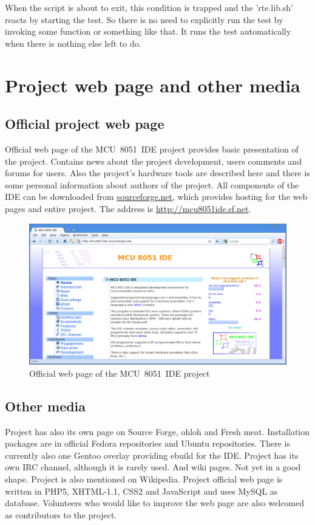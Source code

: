 \documentclass[a4paper,twoside,12pt]{book}
\begin{document}
		When the script is about to exit, this condition is trapped and the 'rte.lib.sh' reacts by starting the test. So there is no need to explicitly run the test by invoking some function or something like that. It runs the test automatically when there is nothing else left to do.

\chapter{Project web page and other media}
	\section{Official project web page}
		Official web page of the MCU~8051~IDE project provides basic presentation of the project. Contains news about the project development, users comments and forums for users. Also the project's hardware tools are described here and there is some personal information about authors of the project. All components of the IDE can be downloaded from \href{www.sourceforge.net}{sourceforge.net}, which provides hosting for the web pages and entire project. The address is \url{http://mcu8051ide.sf.net}.
		\begin{figure}[h!]
			\centering{}
			\includegraphics[width=\textwidth]{img/026.png}
			\caption{Official web page of the MCU~8051~IDE project}
		\end{figure}

	\section{Other media}
		Project has also its own page on Source Forge, ohloh and Fresh meat. Installation packages are in official Fedora repositories and Ubuntu repositories.  There is currently also one Gentoo overlay providing ebuild for the IDE. Project has its own IRC channel, although it is rarely used. And wiki pages. Not yet in a good shape. Project is also mentioned on Wikipedia. Project official web page is written in PHP5, XHTML-1.1, CSS2 and JavaScript and uses MySQL as database. Volunteers who would like to improve the web page are also welcomed as contributors to the project.
\end{document}
